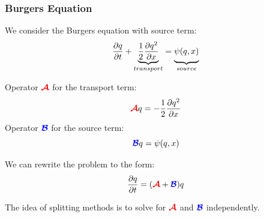 
\PraesentationTitelseite %


\begin{frame}
    \frametitle{Burgers Equation}
    
We consider the Burgers equation with source term:
\begin{equation*}
	\frac{\partial q}{\partial t} + \underbrace{\frac{1}{2}\frac{\partial q^2}{\partial x}}_{transport} = \underbrace{\vphantom{\frac{\partial q}{\partial t}}\psi (q,x)}_{source}
	\label{eq:system}
\end{equation*}

\vspace{0.6cm}
\begin{multicols}{2}
    \centering
    Operator ${\color{red}\bm{\mathcal{A}}}$ for the transport term: 
    \begin{equation*}
        {\color{red}\bm{\mathcal{A}}}q = - \frac{1}{2}\frac{\partial q^2}{\partial x}
    \end{equation*}
    Operator ${\color{blue}\bm{\mathcal{B}}}$ for the source term: 
    \begin{equation*}
        {\color{blue}\bm{\mathcal{B}}}q = \psi (q,x)
    \end{equation*}
\end{multicols}

\vspace{0.6cm}
\pause
We can rewrite the problem to the form: 
\begin{equation*}
	\frac{\partial q}{\partial t} = ({\color{red}\bm{\mathcal{A}}} + {\color{blue}\bm{\mathcal{B}}}) q 	
	\label{eq:generalPDE}
\end{equation*}

The idea of splitting methods is to solve for ${\color{red}\bm{\mathcal{A}}}$ and ${\color{blue}\bm{\mathcal{B}}}$ independently.

\end{frame}






